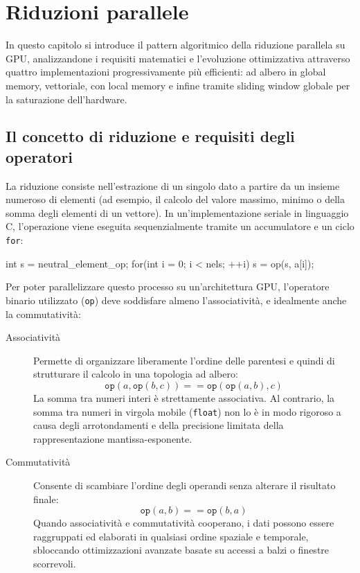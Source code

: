 \chapter{Riduzioni parallele}\label{chap:opencl_reduce}

In questo capitolo si introduce il pattern algoritmico della riduzione parallela su GPU, analizzandone i requisiti matematici e l'evoluzione ottimizzativa attraverso quattro implementazioni progressivamente più efficienti: ad albero in global memory, vettoriale, con local memory e infine tramite sliding window globale per la saturazione dell'hardware.

\section{Il concetto di riduzione e requisiti degli operatori}\label{sec:reduce_concetto}

La riduzione consiste nell'estrazione di un singolo dato a partire da un insieme numeroso di elementi (ad esempio, il calcolo del valore massimo, minimo o della somma degli elementi di un vettore). In un'implementazione seriale in linguaggio C, l'operazione viene eseguita sequenzialmente tramite un accumulatore e un ciclo \texttt{for}:

\begin{code}[caption={Riduzione seriale in C}, label={code:reduce_seriale}]
int s = neutral_element_op;
for(int i = 0; i < nels; ++i){
    s = op(s, a[i]);
}
\end{code}

Per poter parallelizzare questo processo su un'architettura GPU, l'operatore binario utilizzato (\texttt{op}) deve soddisfare almeno l'associatività, e idealmente anche la commutatività:
\begin{description}
    \item[Associatività] Permette di organizzare liberamente l'ordine delle parentesi e quindi di strutturare il calcolo in una topologia ad albero:
    \[
    \texttt{op}(a, \texttt{op}(b, c)) == \texttt{op}(\texttt{op}(a, b), c)
    \]
    La somma tra numeri interi è strettamente associativa. Al contrario, la somma tra numeri in virgola mobile (\texttt{float}) non lo è in modo rigoroso a causa degli arrotondamenti e della precisione limitata della rappresentazione mantissa-esponente.
    \item[Commutatività] Consente di scambiare l'ordine degli operandi senza alterare il risultato finale:
    \[
    \texttt{op}(a, b) == \texttt{op}(b, a)
    \]
    Quando associatività e commutatività cooperano, i dati possono essere raggruppati ed elaborati in qualsiasi ordine spaziale e temporale, sbloccando ottimizzazioni avanzate basate su accessi a balzi o finestre scorrevoli.
\end{description}

